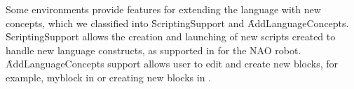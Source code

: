 






Some environments provide features for extending the language with new concepts, which we classified into \f{ScriptingSupport} and \f{AddLanguageConcepts}. %
\f{ScriptingSupport} allows the creation and launching of new scripts created to handle new language constructs, as supported in \choregraphe for the NAO robot. \f{AddLanguageConcepts} support allows user to edit and create new blocks, for example, myblock in \makeblock or creating new blocks in \tivipe. 


